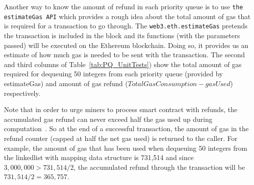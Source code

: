 Another way to know the amount of refund in each priority queue is to use \texttt{the estimateGas API} which provides a rough idea about the total amount of gas that is required for a transaction to go through. The \texttt{web3.eth.estimateGas} pretends the transaction is included in the block  and its functions (with the parameters passed) will be executed on the Ethereum blockchain. Doing so, it provides us an estimate of how much gas is needed to be sent with the transaction. The second and third columns of Table~\ref{tab:PQ_UnitTests}) show the total amount of gas required for dequeuing 50 integers from each priority queue (provided by estimateGas) and amount of gas refund ($Total Gas Consumption - gasUsed$) respectively.

Note that in order to urge miners to process smart contract with refunds, the accumulated gas refund can never exceed half the gas used up during computation~\cite{wood2014ethereum}. So at the end of a successful transaction, the amount of gas in the refund counter (capped at half the net gas used) is returned to the caller. For example, the amount of gas that has been used when dequeuing 50 integers from the linkedlist with mapping data structure is 731,514 and since $3,000,000 > 731,514/2$, the accumulated refund through the transaction will be $731,514/2 = 365,757$.


